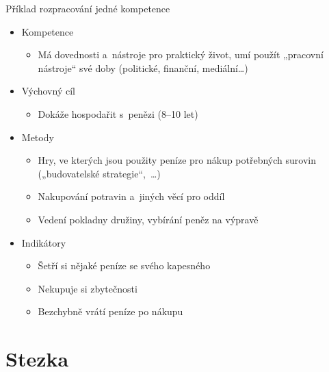 \documentclass[compress, ucs, xelatex, xcolor=dvipsnames, print,
  hyperref={
    bookmarks=true,
    unicode=true,
    colorlinks=true,
    plainpages=false,
    pdfkeywords={Skaut, Junak, Skauting, Vychovna metoda},
    linkcolor=Black,
    anchorcolor=Black,
    citecolor=OliveGreen,
    filecolor=OliveGreen,
    menucolor=Black,
    urlcolor=OliveGreen,
    pdftex}
  ]{beamer}
\begin{document}
\begin{frame}{Příklad rozpracování jedné kompetence}
  \begin{itemize}
    \item Kompetence
    \begin{itemize}
      \item Má dovednosti a~nástroje pro praktický život, umí použít „pracovní nástroje“ své doby (politické, finanční, mediální\ldots)
    \end{itemize}
    \item Výchovný cíl
    \begin{itemize}
      \item Dokáže hospodařit s~penězi (8--10 let)
    \end{itemize}
    \item Metody
    \begin{itemize}
      \item Hry, ve kterých jsou použity peníze pro nákup potřebných surovin („budovatelské strategie“,~\ldots)
      \item Nakupování potravin a~jiných věcí pro oddíl
      \item Vedení pokladny družiny, vybírání peněz na výpravě
    \end{itemize}
    \item Indikátory
    \begin{itemize}
      \item Šetří si nějaké peníze se svého kapesného
      \item Nekupuje si zbytečnosti
      \item Bezchybně vrátí peníze po nákupu
    \end{itemize}
  \end{itemize}
\end{frame}

\section{Stezka}
\end{document}
